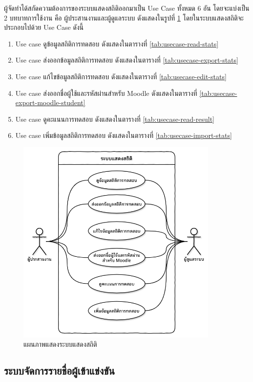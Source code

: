 ผู้จัดทำได้สกัดความต้องการของระบบแสดงสถิติออกมาเป็น Use Case ทั้งหมด 6 อัน โดยจะแบ่งเป็น 2 บทบาทการใช้งาน คือ ผู้ประสานงานและผู้ดูแลระบบ ดังแสดงในรูปที่ \ref{fig:package-display-stats-diagram}
โดยในระบบแสดงสถิติจะประกอบไปด้วย Use Case ดังนี้
\begin{enumerate}
    \item Use case ดูข้อมูลสถิติการทดสอบ ดังแสดงในตารางที่ \ref{tab:usecase-read-stats}
    \item Use case ส่งออกข้อมูลสถิติการทดสอบ ดังแสดงในตารางที่ \ref{tab:usecase-export-stats}
    \item Use case แก้ไขข้อมูลสถิติการทดสอบ ดังแสดงในตารางที่ \ref{tab:usecase-edit-stats}
    \item Use case ส่งออกชื่อผู้ใช้และรหัสผ่านสำหรับ Moodle ดังแสดงในตารางที่ \ref{tab:usecase-export-moodle-student}
    \item Use case ดูคะแนนการทดสอบ ดังแสดงในตารางที่ \ref{tab:usecase-read-result}
    \item Use case เพิ่มข้อมูลสถิติการทดสอบ ดังแสดงในตารางที่ \ref{tab:usecase-import-stats}
\end{enumerate}

\begin{figure}[H]
    \centering
    \includegraphics[width=100mm,scale=1.0]{diagrams/package-display-stats.png}
    \caption{แผนภาพแสดงระบบแสดงสถิติ}
    \label{fig:package-display-stats-diagram}
\end{figure}

\subsection{ระบบจัดการรายชื่อผู้เข้าแข่งขัน}


